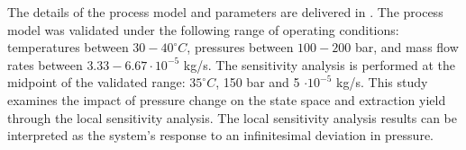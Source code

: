 \documentclass[../Article_Sensitivity_Analsysis.tex]{subfiles}
\begin{document}
	
	\label{CH: Results}
	
	The details of the process model and parameters are delivered in \citet{Sliczniuk2024}. The process model was validated under the following range of operating conditions: temperatures between $30 - 40^\circ C$, pressures between $100 - 200$ bar, and mass flow rates between $3.33-6.67 \cdot 10^{-5}$ kg/s. The sensitivity analysis is performed at the midpoint of the validated range: $35^\circ C$, 150 bar and 5 $\cdot 10^{-5}$ kg/s. This study examines the impact of pressure change on the state space and extraction yield through the local sensitivity analysis. The local sensitivity analysis results can be interpreted as the system's response to an infinitesimal deviation in pressure.
	
        
    
    
	
\end{document}
